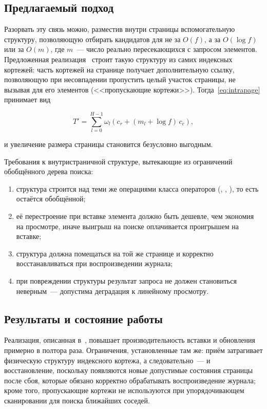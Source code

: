\subsection{Предлагаемый подход}

Разорвать эту связь можно, разместив внутри страницы вспомогательную структуру,
позволяющую отбирать кандидатов для  не за $O(f)$, а за
$O(\log f)$ или за $O(m)$, где $m$~--- число реально пересекающихся с запросом
элементов. Предложенная реализация~\cite{borodin2019intrapage} строит такую
структуру из самих индексных кортежей: часть кортежей на странице получает
дополнительную ссылку, позволяющую при несовпадении пропустить целый участок
страницы, не вызывая  для его элементов (<<пропускающие
кортежи>>). Тогда~\eqref{eq:intrapage} принимает вид

\begin{equation}
T' = \sum_{l=0}^{H-1} \omega_l \left( c_r + (m_l + \log f)\,c_c \right),
\end{equation}

и увеличение размера страницы становится безусловно выгодным.

Требования к внутристраничной структуре, вытекающие из ограничений
обобщённого дерева поиска:

\begin{enumerate}
\item структура строится над теми же операциями класса операторов
      (, , ), то есть остаётся
      обобщённой;
\item её перестроение при вставке элемента должно быть дешевле, чем экономия на
      просмотре, иначе выигрыш на поиске оплачивается проигрышем на вставке;
\item структура должна помещаться на той же странице и корректно
      восстанавливаться при воспроизведении журнала;
\item при повреждении структуры результат запроса не должен становиться
      неверным~--- допустима деградация к линейному просмотру.
\end{enumerate}

\subsection{Результаты и состояние работы}

Реализация, описанная в~\cite{borodin2019intrapage}, повышает
производительность вставки и обновления примерно в полтора раза. Ограничения,
установленные там же: приём затрагивает физическую структуру индексного
кортежа, а следовательно~--- и восстановление, поскольку появляются новые
допустимые состояния страницы после сбоя, которые обязано корректно
обрабатывать воспроизведение журнала; кроме того, пропускающие кортежи не
используются при упорядочивающем сканировании для поиска ближайших соседей.

